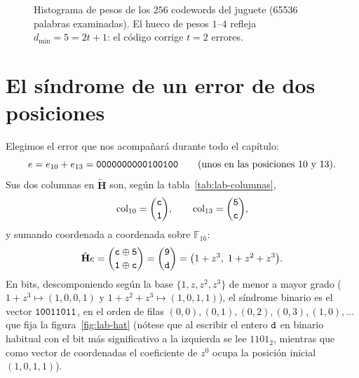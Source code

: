 \documentclass[11pt,a4paper,oneside]{report}
\newcommand{\GF}[1]{\mathbb{F}_{#1}}
\newcommand{\Hmat}{\mathbf{H}}          %
\newcommand{\hx}[1]{\text{\texttt{#1}}}
\begin{document}
\begin{figure}[htbp]
\centering
{}
\caption{Histograma de pesos de los $256$ codewords del juguete
(\num{65536} palabras examinadas). El hueco de pesos $1$--$4$ refleja
$d_{\min}=5=2t+1$: el código corrige $t=2$ errores.}
\label{fig:lab-pesos}
\end{figure}

\section{El síndrome de un error de dos posiciones}

Elegimos el error que nos acompañará durante todo el capítulo:
\[
e=e_{10}+e_{13}=\hx{0000000000100100}
\qquad(\text{unos en las posiciones }10\text{ y }13).
\]
Sus dos columnas en $\tilde{\Hmat}$ son, según la
tabla~\ref{tab:lab-columnas},
\[
\text{col}_{10}=\binom{\hx c}{\hx 1},\qquad
\text{col}_{13}=\binom{\hx 5}{\hx c},
\]
y sumando coordenada a coordenada sobre $\GF{16}$:
\[
\tilde{\Hmat} e=\binom{\hx c\oplus\hx 5}{\hx 1\oplus\hx c}
=\binom{\hx 9}{\hx d}
=\bigl(1+z^3,\;1+z^2+z^3\bigr).
\]
En bits, descomponiendo según la base $\{1,z,z^2,z^3\}$ de menor a mayor
grado ($1+z^3 \mapsto (1,0,0,1)$ y $1+z^2+z^3 \mapsto (1,0,1,1)$), el
síndrome binario es el vector $\hx{10011011}$, en el orden de filas
$(0,0),(0,1),(0,2),(0,3),(1,0),\dots$ que fija la
figura~\ref{fig:lab-hat} (nótese que al escribir el entero $\hx d$ en binario
habitual con el bit más significativo a la izquierda se lee $1101_2$, mientras
que como vector de coordenadas el coeficiente de $z^0$ ocupa la posición inicial
$(1,0,1,1)$).
\end{document}

